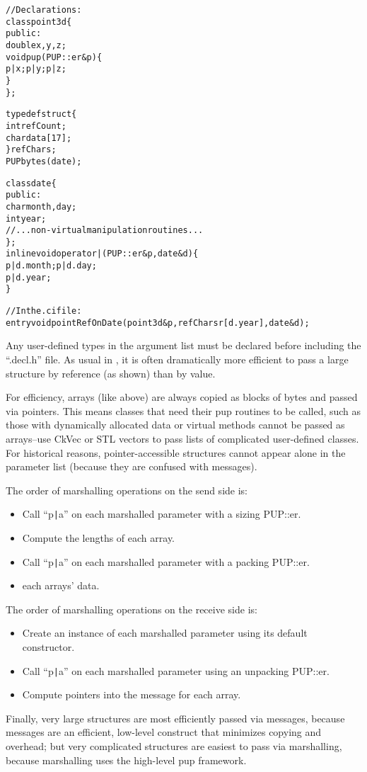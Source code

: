 \begin{alltt}
//Declarations:
class point3d \{
public:
    double x,y,z;    
    void pup(PUP::er &p) \{
      p|x; p|y; p|z;
    \}
\};

typedef struct \{
    int refCount;
    char data[17];
\} refChars;
PUPbytes(date);

class date \{
public:
    char month,day;
    int year;
    //...non-virtual manipulation routines...
\};
inline void operator|(PUP::er &p,date &d) \{
    p|d.month; p|d.day;
    p|d.year;
\}

//In the .ci file:
    entry void pointRefOnDate(point3d &p,refChars r[d.year],date &d);
\end{alltt}

Any user-defined types in the argument list must be declared 
before including the ``.decl.h'' file.
As usual in \CC, it is often dramatically more efficient to pass
a large structure by reference (as shown) than by value.

For efficiency, arrays (like  above) are always copied
as blocks of bytes and passed via pointers.  This means classes
that need their pup routines to be called, such as those with dynamically
allocated data or virtual methods cannot be passed as arrays--use CkVec
or STL vectors to pass lists of complicated user-defined classes. 
For historical reasons, pointer-accessible structures 
cannot appear alone in the parameter list (because they are confused 
with messages).

The order of marshalling operations on the send side is:
\begin{itemize}
\item Call ``p\verb.|.a'' on each marshalled parameter with a sizing PUP::er.
\item Compute the lengths of each array.
\item Call ``p\verb.|.a'' on each marshalled parameter with a packing PUP::er.
\item {} each arrays' data.
\end{itemize}

The order of marshalling operations on the receive side is:
\begin{itemize}
\item Create an instance of each marshalled parameter using its default constructor.
\item Call ``p\verb.|.a'' on each marshalled parameter using an unpacking PUP::er.
\item Compute pointers into the message for each array.
\end{itemize}

Finally, very large structures are most efficiently passed via messages,
because messages are an efficient, low-level construct that minimizes copying
and overhead; but very complicated structures are easiest to pass via 
marshalling, because marshalling uses the high-level pup framework.
